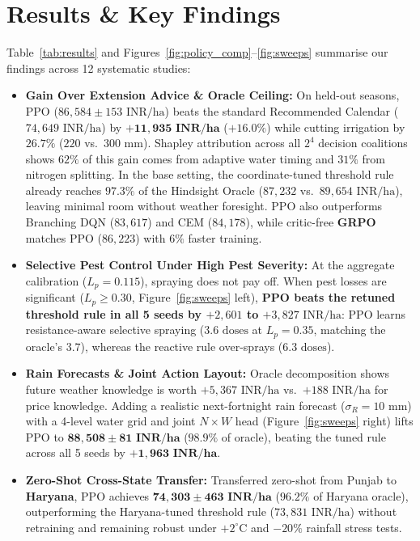 \documentclass[10pt,twocolumn]{article}
\begin{document}
\section{Results \& Key Findings}
Table~\ref{tab:results} and Figures~\ref{fig:policy_comp}--\ref{fig:sweeps} summarise our findings across 12 systematic studies:
\begin{itemize}
    \item \textbf{Gain Over Extension Advice \& Oracle Ceiling:} On held-out seasons, PPO ($86{,}584 \pm 153\text{ INR/ha}$) beats the standard Recommended Calendar ($74{,}649\text{ INR/ha}$) by $\mathbf{+11{,}935\text{ INR/ha}}$ ($\mathbf{+16.0\%}$) while cutting irrigation by $\mathbf{26.7\%}$ ($220$ vs.\ $300\text{ mm}$). Shapley attribution across all $2^4$ decision coalitions shows $62\%$ of this gain comes from adaptive water timing and $31\%$ from nitrogen splitting. In the base setting, the coordinate-tuned threshold rule already reaches $97.3\%$ of the Hindsight Oracle ($87{,}232$ vs.\ $89{,}654\text{ INR/ha}$), leaving minimal room without weather foresight. PPO also outperforms Branching DQN ($83{,}617$) and CEM ($84{,}178$), while critic-free \textbf{GRPO} matches PPO ($86{,}223$) with $6\%$ faster training.
    \item \textbf{Selective Pest Control Under High Pest Severity:} At the aggregate calibration ($L_p = 0.115$), spraying does not pay off. When pest losses are significant ($L_p \ge 0.30$, Figure~\ref{fig:sweeps} left), \textbf{PPO beats the retuned threshold rule in all 5 seeds by $+2{,}601$ to $+3{,}827\text{ INR/ha}$}: PPO learns resistance-aware selective spraying ($3.6\text{ doses}$ at $L_p=0.35$, matching the oracle's $3.7$), whereas the reactive rule over-sprays ($6.3\text{ doses}$).
    \item \textbf{Rain Forecasts \& Joint Action Layout:} Oracle decomposition shows future weather knowledge is worth $+5{,}367\text{ INR/ha}$ vs.\ $+188\text{ INR/ha}$ for price knowledge. Adding a realistic next-fortnight rain forecast ($\sigma_R = 10\text{ mm}$) with a 4-level water grid and joint $N\times W$ head (Figure~\ref{fig:sweeps} right) lifts PPO to $\mathbf{88{,}508 \pm 81\text{ INR/ha}}$ ($\mathbf{98.9\%}$ of oracle), beating the tuned rule across all 5 seeds by $\mathbf{+1{,}963\text{ INR/ha}}$.
    \item \textbf{Zero-Shot Cross-State Transfer:} Transferred zero-shot from Punjab to \textbf{Haryana}, PPO achieves $\mathbf{74{,}303 \pm 463\text{ INR/ha}}$ ($96.2\%$ of Haryana oracle), outperforming the Haryana-tuned threshold rule ($73{,}831\text{ INR/ha}$) without retraining and remaining robust under $+2^\circ\text{C}$ and $-20\%$ rainfall stress tests.
\end{itemize}
\end{document}
